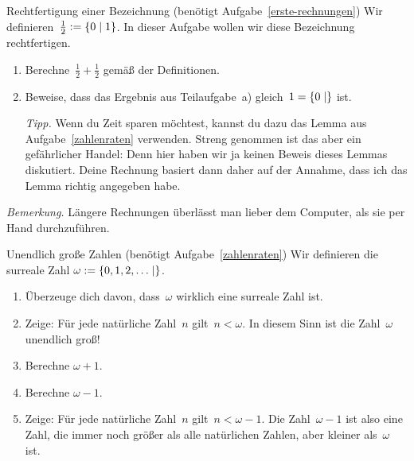 \documentclass{../zirkelblatt}
\begin{document}
\begin{aufgabe}{Rechtfertigung einer Bezeichnung (benötigt Aufgabe~\ref{erste-rechnungen})}
Wir definieren~$\tfrac{1}{2} := \{ 0 \mathrel{|} 1 \}$. In dieser Aufgabe wollen wir diese
Bezeichnung rechtfertigen.
\begin{enumerate}
\item Berechne~$\tfrac{1}{2} + \tfrac{1}{2}$ gemäß der Definitionen.
\item Beweise, dass das Ergebnis aus Teilaufgabe~a) gleich~$1 = \{ 0 \mathrel{|}  \}$ ist.

\emph{Tipp.} Wenn du Zeit sparen möchtest, kannst du dazu das Lemma aus
Aufgabe~\ref{zahlenraten} verwenden. Streng genommen ist das aber ein
gefährlicher Handel: Denn hier haben wir ja keinen Beweis dieses Lemmas
diskutiert. Deine Rechnung basiert dann daher auf der Annahme, dass ich das
Lemma richtig angegeben habe.
\end{enumerate}

\emph{Bemerkung.} Längere Rechnungen überlässt man lieber dem Computer, als sie
per Hand durchzuführen.
\end{aufgabe}

\begin{aufgabe}{Unendlich große Zahlen (benötigt Aufgabe~\ref{zahlenraten})}
\label{transfinit}
Wir definieren die surreale Zahl
$\omega := \{ 0, 1, 2, \ldots \mathrel{|}  \}$.
\begin{enumerate}
\item Überzeuge dich davon, dass~$\omega$ wirklich eine surreale Zahl ist.
\item Zeige: Für jede natürliche Zahl~$n$ gilt~$n < \omega$. In diesem Sinn ist
die Zahl~$\omega$ unendlich groß!
\item Berechne $\omega + 1$.
\item Berechne $\omega - 1$.
\item Zeige: Für jede natürliche Zahl~$n$ gilt~$n < \omega - 1$. Die
Zahl~$\omega - 1$ ist also eine Zahl, die immer noch größer als alle
natürlichen Zahlen, aber kleiner als~$\omega$ ist.
\end{enumerate}
\end{aufgabe}
\end{document}
